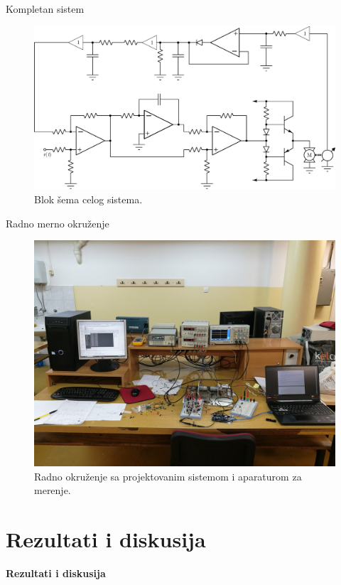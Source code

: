 \documentclass[aspectratio=169,xcolor=dvipsnames]{beamer}
\begin{document}

\begin{frame}{Kompletan sistem}
    \begin{figure}
    \includegraphics[width=0.75\linewidth]{fig/elFull.pdf}
    \caption{Blok šema celog sistema.}
    \end{figure}
\end{frame}


\begin{frame}{Radno merno okruženje}
    \begin{figure}
    \includegraphics[width=0.6\linewidth]{fig/img/lab.jpg}
    \caption{Radno okruženje sa projektovanim sistemom i aparaturom za merenje.}
    \end{figure}
\end{frame}


\section{Rezultati i diskusija}

\begin{frame}
    \Huge{\centerline{\textbf{Rezultati i diskusija}}}
\end{frame}
\end{document}
